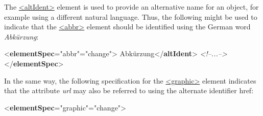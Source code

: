 The \hyperref[TEI.altIdent]{<altIdent>} element is used to provide an alternative name for an object, for example using a different natural language. Thus, the following might be used to indicate that the \hyperref[TEI.abbr]{<abbr>} element should be identified using the German word \textit{Abkürzung}: \par\bgroup{}\exampleFont \begin{shaded}\noindent\mbox{}{<\textbf{elementSpec}\hspace*{1em}{ident}="{abbr}"\hspace*{1em}{mode}="{change}">}\mbox{}\newline 
{}Abkürzung{</\textbf{altIdent}>}\mbox{}\newline 
\textit{<!--...-->}\mbox{}\newline 
{</\textbf{elementSpec}>}\end{shaded}\egroup\par \noindent  In the same way, the following specification for the \hyperref[TEI.graphic]{<graphic>} element indicates that the attribute {\itshape url} may also be referred to using the alternate identifier \textsf{href}: \par\bgroup{}\exampleFont \begin{shaded}\noindent\mbox{}{<\textbf{elementSpec}\hspace*{1em}{ident}="{graphic}"\hspace*{1em}{mode}="{change}">}\mbox{}\newline 
{}\mbox{}\newline 
\hspace*{1em}\mbox{}\newline 

\end{shaded}
